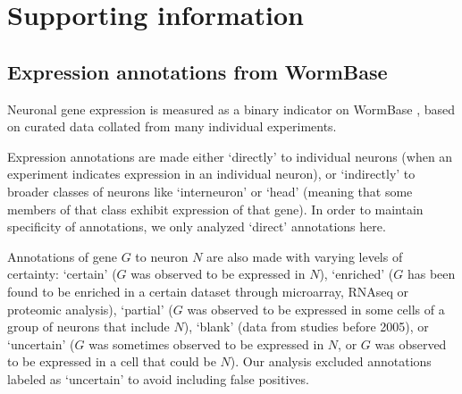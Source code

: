 \documentclass[10pt,letterpaper]{article}
\begin{document}




\newpage
\section*{Supporting information}
\setcounter{figure}{0} \renewcommand{\thefigure}{S\arabic{figure}}
\renewcommand{\thefigure}{S\arabic{figure}}

\subsection*{Expression annotations from WormBase}

Neuronal gene expression is measured as a binary indicator on WormBase \cite{Harris:2009kd}, based on curated data collated from many individual experiments.

Expression annotations are made either `directly' to individual neurons (when an experiment indicates expression in an individual neuron), or `indirectly' to broader classes of neurons like `interneuron' or `head' (meaning that some members of that class exhibit expression of that gene).
In order to maintain specificity of annotations, we only analyzed `direct' annotations here.

Annotations of gene $G$ to neuron $N$ are also made with varying levels of certainty:
`certain' ($G$ was observed to be expressed in $N$),
`enriched' ($G$ has been found to be enriched in a certain dataset through microarray, RNAseq or proteomic analysis),
`partial' ($G$ was observed to be expressed in some cells of a group of neurons that include $N$),
`blank' (data from studies before 2005),
or `uncertain' ($G$ was sometimes observed to be expressed in $N$, or $G$ was observed to be expressed in a cell that could be $N$).
Our analysis excluded annotations labeled as `uncertain' to avoid including false positives.
\end{document}
